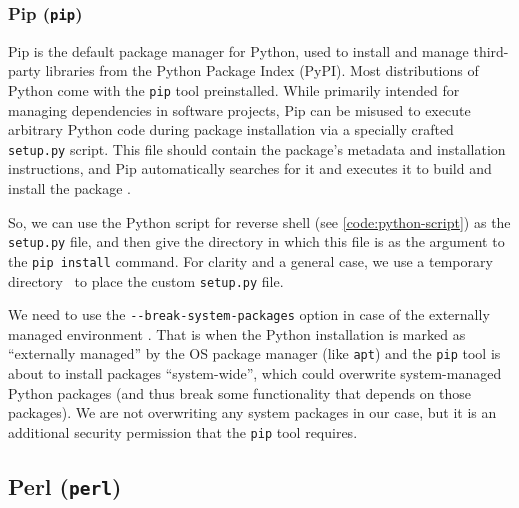 

\subsubsection{Pip (\texttt{pip})}


Pip is the default package manager for Python, used to install and manage third-party libraries from the Python Package Index (PyPI). Most distributions of Python come with the \texttt{pip} tool preinstalled. While primarily intended for managing dependencies in software projects, Pip can be misused to execute arbitrary Python code during package installation via a specially crafted \texttt{setup.py} script. This file should contain the package's metadata and installation instructions, and Pip automatically searches for it and executes it to build and install the package \cite{pip-install-doc}.

So, we can use the Python script for reverse shell (see \cref{code:python-script}) as the \texttt{setup.py} file, and then give the directory in which this file is as the argument to the \texttt{pip install} command. For clarity and a general case, we use a temporary directory \tmp\ to place the custom \texttt{setup.py} file.


We need to use the \texttt{-{}-break-system-packages} option in case of the externally managed environment \cite{pip-install-doc}. That is when the Python installation is marked as ``externally managed'' by the OS package manager (like \texttt{apt}) and the \texttt{pip} tool is about to install packages ``system-wide'', which could overwrite system-managed Python packages (and thus break some functionality that depends on those packages). We are not overwriting any system packages in our case, but it is an additional security permission that the \texttt{pip} tool requires.


\subsection{Perl (\texttt{perl})}

